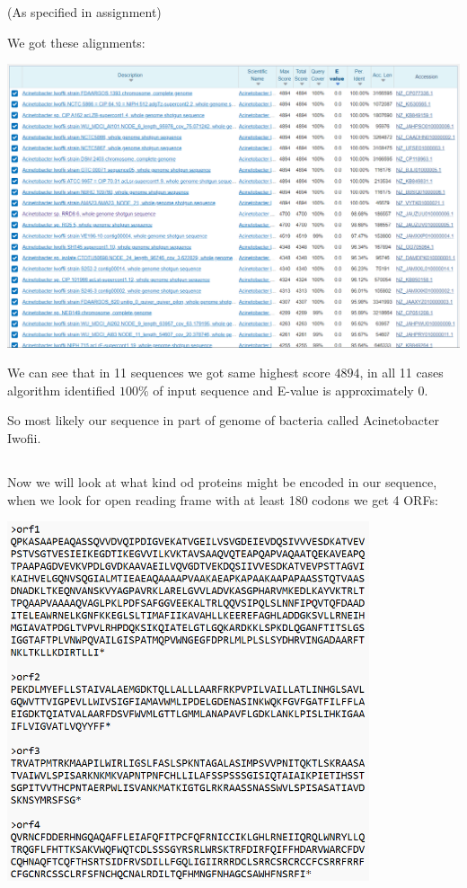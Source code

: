 \documentclass[a4paper]{article}
\begin{document}
	(As specified in assignment)
	
	We got these alignments:
	
	\centerline{\includegraphics[width=1\textwidth]{blast_2}}
	
	We can see that in 11 sequences we got same highest score $4894$,  in all 11 cases algorithm identified $100\%$ of input sequence and E-value is approximately $0$.
	
	So most likely our sequence in part of genome of bacteria called Acinetobacter Iwofii.
	
	\subsection{}
	
	Now we will look at what kind od proteins might be encoded in our sequence, when we look for open reading frame with at least 180 codons we get 4 ORFs:
	
	\centerline{\includegraphics[width=0.8\textwidth]{orf0}}
	
\end{document}
